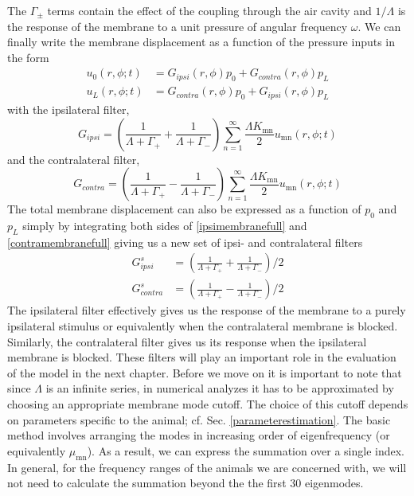 The $\Gamma_\pm$ terms contain the effect of the coupling through the air cavity and $1/\Lambda$ is the response of the membrane to a unit pressure
of angular frequency $\omega$. We can finally write the membrane displacement as a function of the pressure inputs in the form
\begin{align}
 u_0(r,\phi;t)&=G_{ipsi}(r,\phi)p_0+G_{contra}(r,\phi)p_L\label{ipsimembranefull}\\
 u_L(r,\phi;t)&=G_{contra}(r,\phi)p_0+G_{ipsi}(r,\phi)p_L\label{contramembranefull}
\end{align}
with the ipsilateral filter,
\begin{equation}\label{filterdefs1}
 G_{ipsi}=\left(\frac{1}{\Lambda+\Gamma_+}+\frac{1}{\Lambda+\Gamma_-}\right)\displaystyle\sum^\infty_{n=1}\frac{\Lambda K_{\mathrm{mn}}}{2}u_{\mathrm{mn}}(r,\phi;t)
\end{equation}
and the contralateral filter,
\begin{equation}
 G_{contra}=\left(\frac{1}{\Lambda+\Gamma_+}-\frac{1}{\Lambda+\Gamma_-}\right)\displaystyle\sum^\infty_{n=1}\frac{\Lambda K_{\mathrm{mn}}}{2}u_{\mathrm{mn}}(r,\phi;t)
\end{equation}
The total membrane displacement can also be expressed as a function of $p_0$ and $p_L$ simply by integrating both sides of \eqref{ipsimembranefull}
and \eqref{contramembranefull} giving us a new set of ipsi- and contralateral filters
\begin{align}
 G^s_{ipsi}&=\left(\frac{1}{\Lambda+\Gamma_+}+\frac{1}{\Lambda+\Gamma_-}\right)/2 \label{ipsimembranetotal}\\
 G^s_{contra}&=\left(\frac{1}{\Lambda+\Gamma_+}-\frac{1}{\Lambda+\Gamma_-}\right)/2 \label{contramembranetotal}
\end{align}
The ipsilateral filter effectively gives us the response of the membrane to a purely ipsilateral stimulus or equivalently when the contralateral membrane
is blocked. Similarly, the contralateral filter gives us its response when the ipsilateral membrane is blocked. These filters
will play an important role in the evaluation of the model in the next chapter. Before we move on it is important to note that since $\Lambda$ is an infinite series,
in numerical analyzes it has to be approximated by choosing an appropriate membrane mode cutoff. The choice of this
cutoff depends on parameters specific to the animal; cf. Sec. \ref{parameterestimation}. The basic method involves arranging the modes in increasing order of eigenfrequency
(or equivalently $\mu_{\mathrm{mn}}$). As a result, we can express the summation over a single index. In general, for the frequency ranges of the animals
we are concerned with, we will not need to calculate the summation beyond the the first $30$ eigenmodes.

